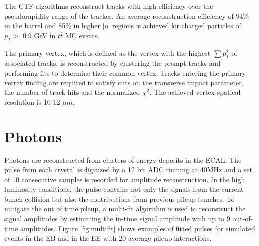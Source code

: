 \documentclass[thesis.tex]{subfiles}
\begin{document}
The CTF algorithms reconstruct tracks with high efficiency over the pseudorapidity range of the tracker.
An average reconstruction efficiency of 94\% in the barrel and 85\% in higher $|\eta|$ regions is achieved for charged particles of $p_T >$ 0.9 GeV in $t\bar{t}$ MC events. 

The primary vertex, which is defined as the vertex with the highest $\sum p_T^2$ of associated tracks, is reconstructed by clustering the prompt tracks and performing fits to determine their common vertex. 
Tracks entering the primary vertex finding are required to satisfy cuts on the transverse impact parameter, the number of track hits and the normalized $\chi^2$.
The achieved vertex spatical resolution is 10-12 $\mu m$.

\section{Photons}

Photons are reconstructed from clusters of energy deposits in the ECAL.
The pulse from each crystal is digitized by a 12 bit ADC running at 40MHz and a set of 10 consecutive samples is recorded for amplitude reconstruction.
In the high luminosity conditions, the pulse contains not only the signals from the current bunch collision but also the contributions from previous pileup bunches.
To mitigate the out of time pileup, a multi-fit algorithm is used to reconstruct the signal amplitudes by estimating the in-time signal amplitude with up to 9 out-of-time amplitudes.
Figure \ref{fig:multifit} shows examples of fitted pulses for simulated events in the EB and in the EE with 20 average pileup interactions.
\end{document}
